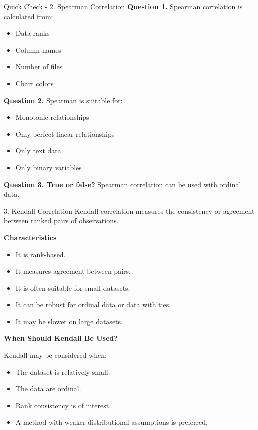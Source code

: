\documentclass[aspectratio=169,11pt]{beamer}
\begin{document}
\begin{frame}[allowframebreaks]{Quick Check - 2. Spearman Correlation}
\footnotesize
\textbf{Question 1.} Spearman correlation is calculated from:\par\medskip
\begin{itemize}
\item[\textbf{A.}] Data ranks
\item[\textbf{B.}] Column names
\item[\textbf{C.}] Number of files
\item[\textbf{D.}] Chart colors
\end{itemize}
\textbf{Question 2.} Spearman is suitable for:\par\medskip
\begin{itemize}
\item[\textbf{A.}] Monotonic relationships
\item[\textbf{B.}] Only perfect linear relationships
\item[\textbf{C.}] Only text data
\item[\textbf{D.}] Only binary variables
\end{itemize}
\textbf{Question 3. True or false?} Spearman correlation can be used with ordinal data.\par\medskip
\end{frame}
\begin{frame}[allowframebreaks]{3. Kendall Correlation}
\small
Kendall correlation measures the consistency or agreement between ranked pairs of observations.\par\medskip
\textbf{Characteristics}\par\medskip
\begin{itemize}
\item It is rank-based.
\item It measures agreement between pairs.
\item It is often suitable for small datasets.
\item It can be robust for ordinal data or data with ties.
\item It may be slower on large datasets.
\end{itemize}
\textbf{When Should Kendall Be Used?}\par\medskip
Kendall may be considered when:\par\medskip
\begin{itemize}
\item The dataset is relatively small.
\item The data are ordinal.
\item Rank consistency is of interest.
\item A method with weaker distributional assumptions is preferred.
\end{itemize}
\end{frame}
\end{document}

